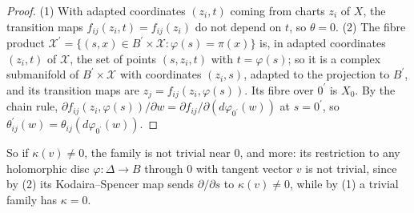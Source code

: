 \begin{proof}
(1) With adapted coordinates $(z_i, t)$ coming from charts $z_i$ of $X$, the transition maps $f_{ij}(z_i, t) = f_{ij}(z_i)$ do not depend on $t$, so $\theta = 0$. (2) The fibre product
$\mathcal{X}^{\prime} = \{(s, x) \in B^{\prime} \times \mathcal{X} : \varphi(s) = \pi(x)\}$ is, in adapted coordinates $(z_i, t)$ of $\mathcal{X}$, the set of points $(s, z_i, t)$ with $t = \varphi(s)$; so it is a complex
submanifold of $B^{\prime} \times \mathcal{X}$ with coordinates $(z_i, s)$, adapted to the projection to $B^{\prime}$, and its transition maps are $z_j = f_{ij}(z_i, \varphi(s))$. Its fibre over $0^{\prime}$ is $X_0$. By the
chain rule, $\partial f_{ij}(z_i, \varphi(s))/\partial w = \partial f_{ij}/\partial(d\varphi_{0^{\prime}}(w))$ at $s = 0^{\prime}$, so $\theta^{\prime}_{ij}(w) = \theta_{ij}(d\varphi_{0^{\prime}}(w))$.
\end{proof}

So if $\kappa(v) \neq 0$, the family is not trivial near $0$, and more: its restriction to any holomorphic disc $\varphi \colon \Delta \to B$ through $0$ with tangent vector $v$ is not trivial, since by (2) its
Kodaira--Spencer map sends $\partial/\partial s$ to $\kappa(v) \neq 0$, while by (1) a trivial family has $\kappa = 0$.

